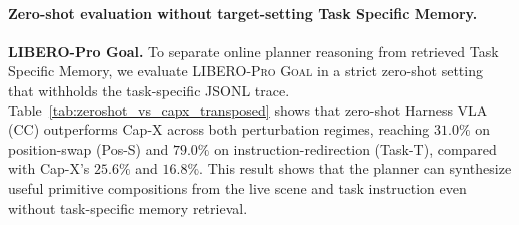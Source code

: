 \documentclass{article}
\begin{document}
\paragraph{Zero-shot evaluation without target-setting Task Specific Memory.}
\textbf{LIBERO-Pro Goal.} To separate online planner reasoning from retrieved Task Specific Memory, we evaluate \textsc{LIBERO-Pro Goal} in a strict zero-shot setting that withholds the task-specific JSONL trace. Table~\ref{tab:zeroshot_vs_capx_transposed} shows that zero-shot Harness VLA (CC) outperforms Cap-X across both perturbation regimes, reaching $31.0\%$ on position-swap (Pos-S) and $79.0\%$ on instruction-redirection (Task-T), compared with Cap-X's $25.6\%$ and $16.8\%$. This result shows that the planner can synthesize useful primitive compositions from the live scene and task instruction even without task-specific memory retrieval.

\begin{table}[htbp]
\centering
\caption{Per-task success rate (\%) on \textsc{LIBERO-Pro Goal}: zero-shot Harness VLA (CC) (no Task Specific Memory retrieval, $10$ seeds/task) vs Cap-X~\citep{fu2026cap} (per-task numbers reproduced from their Appendix table). \textbf{Pos} = swap (S), \textbf{Task} = instruction-redirection (T). Bold marks the per-cell winner.}
\label{tab:zeroshot_vs_capx_transposed}
\small
{}
\end{table}
\end{document}
